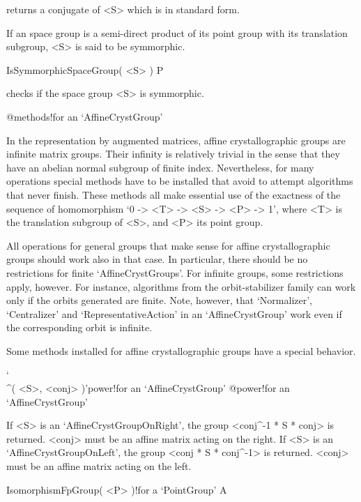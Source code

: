 returns a conjugate of <S> which is in standard form.

If an space group is a semi-direct product of its point group with its
translation subgroup, <S> is said to be symmorphic.

\>IsSymmorphicSpaceGroup( <S> ) P

checks if the space group <S> is symmorphic.



%
{@methods!for an \noexpand`AffineCrystGroup'}

In the representation by augmented matrices, affine crystallographic 
groups are infinite matrix groups. Their infinity is relatively
trivial in the sense that they have an abelian normal subgroup of 
finite index. Nevertheless, for many operations special methods
have to be installed that avoid to attempt algorithms that never
finish. These methods all make essential use of the exactness of the
sequence of homomorphism `0 -> <T> -> <S> -> <P> -> 1', where
<T> is the translation subgroup of <S>, and <P> its point group.

All operations for general groups that make sense for affine
crystallographic groups should work also in that case. In 
particular, there should be no restrictions for finite 
`AffineCrystGroups'. For infinite groups, some restrictions 
apply, however. For instance, algorithms from the orbit-stabilizer 
family can work only if the orbits generated are finite. Note,
however, that `Normalizer', `Centralizer' and `RepresentativeAction'
in an `AffineCrystGroup' work even if the corresponding orbit is
infinite.

Some methods installed for affine crystallographic groups have
a special behavior.

\>`\\^( <S>, <conj> )'{power!for an `AffineCrystGroup'}%
@{power!for an `AffineCrystGroup'}

If <S> is an `AffineCrystGroupOnRight', the group <conj^{-1} * S * conj> 
is returned. <conj> must be an affine matrix acting on the right.
If <S> is an `AffineCrystGroupOnLeft', the group <conj * S * conj^{-1}> 
is returned. <conj> must be an affine matrix acting on the left.

\>IsomorphismFpGroup( <P> )!{for a `PointGroup'} A

